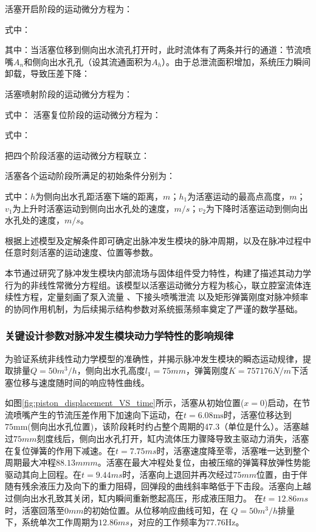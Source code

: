  活塞开启阶段的运动微分方程为：
 
 式中：
 
 
 其中：当活塞位移到侧向出水流孔打开时，此时流体有了两条并行的通道：节流喷嘴$A_n$和侧向出水孔孔（设其流通面积为$A_h$）。由于总泄流面积增加，系统压力瞬间卸载，导致压差下降：
 
 活塞喷射阶段的运动微分方程为：
  
  式中：
活塞复位阶段的运动微分方程为：


式中：


把四个阶段活塞的运动微分方程联立：


活塞各个运动阶段所满足的初始条件分别为：

式中：$h$为侧向出水孔距活塞下端的距离，$m$；$h_1$为活塞运动的最高点高度，$m$；$v_1$为上升时活塞运动到侧向出水孔处的速度，$m/s$；$v_2$为下降时活塞运动到侧向出水孔处的速度，$m/s$。

根据上述模型及定解条件即可确定出脉冲发生模块的脉冲周期，以及在脉冲过程中任意时刻活塞的运动速度、位置等参数\cite{ref68,ref69}。 %

本节通过研究了脉冲发生模块内部流场与固体组件受力特性，构建了描述其动力学行为的非线性常微分方程组。该模型以活塞运动微分方程为核心，联立腔室流体连续性方程，定量刻画了泵入流量 、下接头喷嘴泄流 以及矩形弹簧刚度对脉冲频率的协同作用机制，为后续揭示结构参数对系统振荡频率奠定了严谨的数学基础。

\subsubsection{关键设计参数对脉冲发生模块动力学特性的影响规律}

为验证系统非线性动力学模型的准确性，并揭示脉冲发生模块的瞬态运动规律，提取排量$Q=50m^3/h$，侧向出水孔高度$l_1=75mm$，弹簧刚度$K=757176N/m$下活塞位移与速度随时间的响应特性曲线。

如图\ref{fig:piston_displacement_VS_time}所示，活塞从初始位置($x=0$)启动，在节流喷嘴产生的节流压差作用下加速向下运动，在$t=6.08\mathrm{ms}$时，活塞位移达到$75\mathrm{mm}$(侧向出水孔位置)，该阶段耗时约占整个周期的47.3（单位是什么）。活塞越过$75mm$刻度线后，侧向出水孔打开，缸内流体压力骤降导致主驱动力消失，活塞在复位弹簧的作用下减速。在$t=7.75ms$时，活塞速度降至零，活塞唯一达到整个周期最大冲程$88.13mmm$。活塞在最大冲程处复位，由被压缩的弹簧释放弹性势能驱动其向上回程。在$t=9.44ms$时，活塞向上退回并再次经过$75mm$位置，由于伴随有残余液压力及向下的重力阻碍，回弹段的曲线斜率略低于下击段。活塞向上越过侧向出水孔致其关闭，缸内瞬间重新憋起高压，形成液压阻力。 在$t=12.86ms$时，活塞回落至$0mm$的初始位置。从位移响应曲线可知，在 $Q=50m^3/h$排量下，系统单次工作周期为$12.86ms$，对应的工作频率为$77.76\mathrm{Hz}$。


